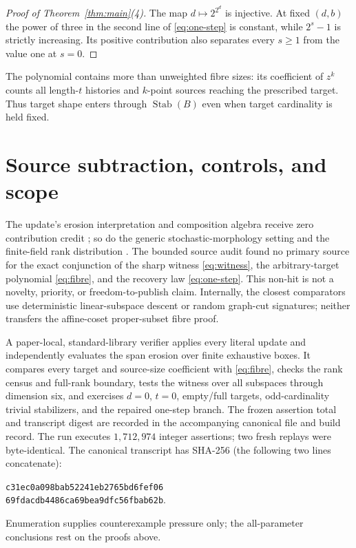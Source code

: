 \documentclass[a4paper,10pt]{amsart}
\newcommand{\Stab}{\operatorname{Stab}}
\begin{document}
\begin{proof}[Proof of Theorem~\ref{thm:main}(4)]
The map $d\mapsto2^{2^d}$ is injective.  At fixed $(d,b)$ the power of three
in the second line of \eqref{eq:one-step} is constant, while $2^s-1$ is
strictly increasing.  Its positive contribution also separates every
$s\geq1$ from the value one at $s=0$.
\end{proof}

The polynomial contains more than unweighted fibre sizes: its coefficient of
$z^k$ counts all length-$t$ histories and $k$-point sources reaching the
prescribed target.  Thus target shape enters through $\Stab(B)$ even when
target cardinality is held fixed.

\section{Source subtraction, controls, and scope}

The update's erosion interpretation and composition algebra receive zero
contribution credit \citep{heijmans_ronse_1990,heijmans_serra_1992}; so do
the generic stochastic-morphology setting \citep{sivakumar_goutsias_1996}
and the finite-field rank distribution \citep{balakin_1968}.  The bounded
source audit found no primary source for the exact conjunction of the sharp
witness \eqref{eq:witness}, the arbitrary-target polynomial
\eqref{eq:fibre}, and the recovery law \eqref{eq:one-step}.  This non-hit is
not a novelty, priority, or freedom-to-publish claim.  Internally, the closest
comparators use deterministic linear-subspace descent or random graph-cut
signatures; neither transfers the affine-coset proper-subset fibre proof.

A paper-local, standard-library verifier applies every literal update and
independently evaluates the span erosion over finite exhaustive boxes.  It
compares every target and source-size coefficient with \eqref{eq:fibre},
checks the rank census and full-rank boundary, tests the witness over all
subspaces through dimension six, and exercises $d=0$, $t=0$, empty/full
targets, odd-cardinality trivial stabilizers, and the repaired one-step
branch.  The frozen assertion total and transcript digest are recorded in
the accompanying canonical file and build record.  The run executes
$1{,}712{,}974$ integer assertions; two fresh replays were byte-identical.
The canonical transcript has SHA-256 (the following two lines concatenate):
\begin{center}
\small\texttt{c31ec0a098bab52241eb2765bd6fef06}\\[-2pt]
\small\texttt{69fdacdb4486ca69bea9dfc56fbab62b}.
\end{center}
Enumeration supplies counterexample pressure only; the all-parameter
conclusions rest on the proofs above.
\end{document}

